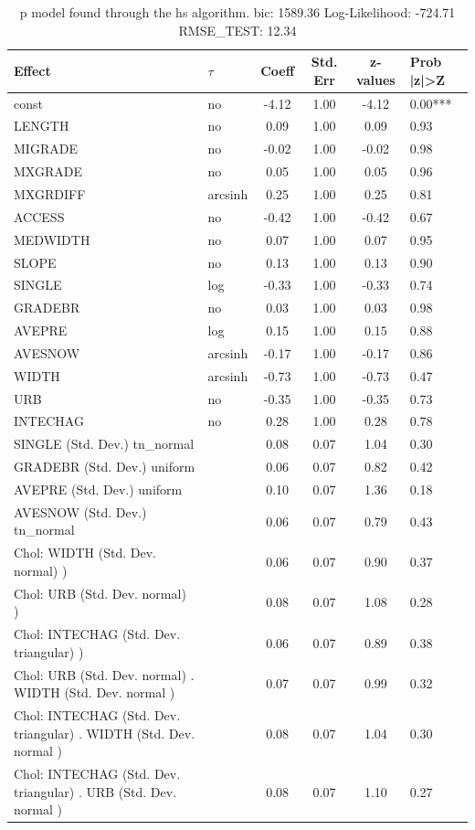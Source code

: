 \begin{table}
	\caption{p model found through the hs algorithm. bic: 1589.36 Log-Likelihood: -724.71 RMSE_TEST: 12.34}
	\begin{center}
		\begin{tabular}{|l|l|c|c|c|l|}
			\hline
			Effect & $\tau$ & Coeff & Std. Err & z-values & Prob |z|>Z \\
			\hline
			const & no & -4.12 & 1.00 & -4.12 & 0.00*** \\
			\hline
			LENGTH & no & 0.09 & 1.00 & 0.09 & 0.93 \\
			\hline
			MIGRADE & no & -0.02 & 1.00 & -0.02 & 0.98 \\
			\hline
			MXGRADE & no & 0.05 & 1.00 & 0.05 & 0.96 \\
			\hline
			MXGRDIFF & arcsinh & 0.25 & 1.00 & 0.25 & 0.81 \\
			\hline
			ACCESS & no & -0.42 & 1.00 & -0.42 & 0.67 \\
			\hline
			MEDWIDTH & no & 0.07 & 1.00 & 0.07 & 0.95 \\
			\hline
			SLOPE & no & 0.13 & 1.00 & 0.13 & 0.90 \\
			\hline
			SINGLE & log & -0.33 & 1.00 & -0.33 & 0.74 \\
			\hline
			GRADEBR & no & 0.03 & 1.00 & 0.03 & 0.98 \\
			\hline
			AVEPRE & log & 0.15 & 1.00 & 0.15 & 0.88 \\
			\hline
			AVESNOW & arcsinh & -0.17 & 1.00 & -0.17 & 0.86 \\
			\hline
			WIDTH & arcsinh & -0.73 & 1.00 & -0.73 & 0.47 \\
			\hline
			URB & no & -0.35 & 1.00 & -0.35 & 0.73 \\
			\hline
			INTECHAG & no & 0.28 & 1.00 & 0.28 & 0.78 \\
			\hline
			SINGLE (Std. Dev.) tn_normal &  & 0.08 & 0.07 & 1.04 & 0.30 \\
			\hline
			GRADEBR (Std. Dev.) uniform &  & 0.06 & 0.07 & 0.82 & 0.42 \\
			\hline
			AVEPRE (Std. Dev.) uniform &  & 0.10 & 0.07 & 1.36 & 0.18 \\
			\hline
			AVESNOW (Std. Dev.) tn_normal &  & 0.06 & 0.07 & 0.79 & 0.43 \\
			\hline
			 Chol: WIDTH (Std. Dev. normal) ) &  & 0.06 & 0.07 & 0.90 & 0.37 \\
			\hline
			 Chol: URB (Std. Dev. normal) ) &  & 0.08 & 0.07 & 1.08 & 0.28 \\
			\hline
			 Chol: INTECHAG (Std. Dev. triangular) ) &  & 0.06 & 0.07 & 0.89 & 0.38 \\
			\hline
			 Chol: URB (Std. Dev. normal) . WIDTH (Std. Dev.   normal ) &  & 0.07 & 0.07 & 0.99 & 0.32 \\
			\hline
			 Chol: INTECHAG (Std. Dev. triangular) . WIDTH (Std. Dev.   normal ) &  & 0.08 & 0.07 & 1.04 & 0.30 \\
			\hline
			 Chol: INTECHAG (Std. Dev. triangular) . URB (Std. Dev.   normal ) &  & 0.08 & 0.07 & 1.10 & 0.27 \\
			\hline
		\end{tabular}
	\end{center}
\end{table}
